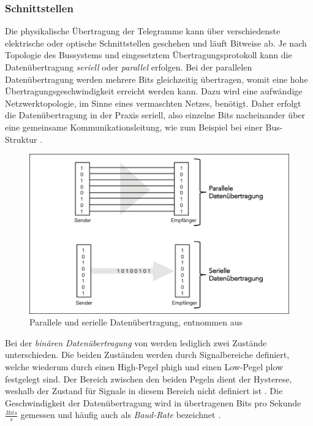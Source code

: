 \subsubsection{Schnittstellen}
\label{sub:schnitt}

Die physikalische Übertragung der Telegramme kann über verschiedenste elektrische oder optische Schnittstellen geschehen und läuft Bitweise ab. Je nach Topologie des Bussystems und eingesetztem Übertragungsprotokoll kann die Datenübertragung \textit{seriell} oder \textit{parallel} erfolgen. Bei der parallelen Datenübertragung werden mehrere Bits gleichzeitig übertragen, womit eine hohe Übertragungsgeschwindigkeit erreicht werden kann. Dazu wird eine aufwändige Netzwerktopologie, im Sinne eines vermaschten Netzes, benötigt. Daher erfolgt die Datenübertragung in der Praxis seriell, also einzelne Bits nacheinander über eine gemeinsame Kommunikationsleitung, wie zum Beispiel bei einer Bus-Struktur \cite[S.~13]{sch08}.

\begin{figure}
\centering
\includegraphics[width=\textwidth]{abbildungen/20160314_seriell}
\caption[Parallele und serielle Datenübertragung]{Parallele und serielle Datenübertragung, entnommen aus \cite[S.~13]{sch08}}
\label{fig:seriell}
\end{figure}


Bei der \textit{binären Datenübertragung} von werden lediglich zwei Zustände unterschieden. Die beiden Zuständen werden durch Signalbereiche definiert, welche wiederum durch einen High-Pegel \gls{phigh} und einen Low-Pegel \gls{plow} festgelegt sind. Der Bereich zwischen den beiden Pegeln dient der Hysterese, weshalb der Zustand für Signale in diesem Bereich nicht definiert ist \cite[S.~9]{sch08}.
Die Geschwindigkeit der Datenübertragung wird in übertragenen Bits pro Sekunde $\frac{Bits}{s}$ gemessen und häufig auch als \textit{Baud-Rate} bezeichnet \cite[S.~22]{sch08}.

